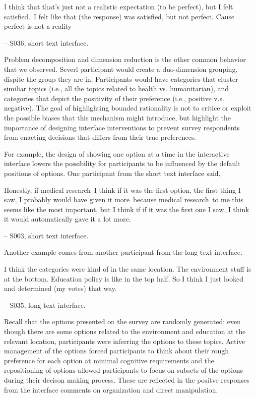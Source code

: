 \begin{displayquote}
I think that that's just not a realistic expectation (to be perfect), but I felt satisfied.~\bracketellipsis I felt like that (the response) was satisfied, but not perfect. Cause perfect is not a reality

\noindent \hfill -- S036, short text interface.
\end{displayquote}

Problem decomposition and dimension reduction is the other common behavior that we observed. Severl participant would create a duo-dimension grouping, dispite the group they are in. Participants would have categories that cluster similiar topics (i.e., all the topics related to health vs. humanitarian), and categories that depict the positivity of their preference (i.e., positive v.s. negative). The goal of highlighting bounded rationality is not to critice or exploit the possible biases that this mechanism might introduce, but highlight the importance of designing interface interventions to prevent survey respondents from enacting decisions that differs from their true preferences.

For example, the design of showing one option at a time in the interactive interface lowers the possibility for participants to be influenced by the default positions of options. One participant from the short text interface said,
\begin{displayquote}
Honestly, if medical research~\bracketellipsis I think if it was the first option, the first thing I saw, I probably would have given it more~\bracketellipsis because medical research~\bracketellipsis to me this seems like the most important, but I think if if it was the first one I saw, I think it would automatically gave it a lot more.
    
\noindent \hfill -- S003, short text interface.
\end{displayquote}

Another example comes from another participant from the long text interface.
\begin{displayquote}
I think the categories were kind of in the same location. The environment stuff is at the bottom. Education policy is like in the top half. So I think I just looked and determined (my votes) that way.
    
\noindent \hfill -- S035, long text interface.
\end{displayquote}
Recall that the options presented on the survey are randomly generated; even though there are some options related to the environment and education at the relevant location, participants were inferring the options to these topics. Active management of the options forced participants to think about their rough preference for each option at minimal cognitive requirements and the repositioning of options allowed participants to focus on subsets of the options during their decison making process. These are reflected in the positve responses from the interface comments on organization and direct manipulation. 

